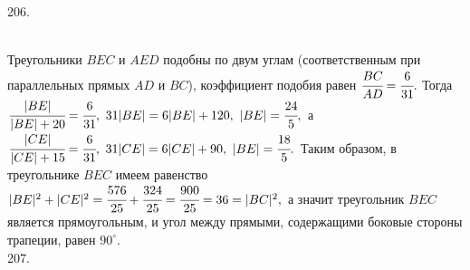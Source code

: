 \documentclass[12pt]{article}
\begin{document}
206. \begin{figure}[ht!]
\end{figure}\\
Треугольники $BEC$ и $AED$ подобны по двум углам (соответственным при параллельных прямых $AD$ и $BC$), коэффициент подобия равен $\cfrac{BC}{AD}=
\cfrac{6}{31}.$ Тогда $\cfrac{|BE|}{|BE|+20}=\cfrac{6}{31},\ 31|BE|=6|BE|+120,\ |BE|=\cfrac{24}{5},$ а $\cfrac{|CE|}{|CE|+15}=\cfrac{6}{31},\ 31|CE|=6|CE|+90,\ |BE|=\cfrac{18}{5}.$ Таким образом, в треугольнике $BEC$ имеем равенство $|BE|^2+|CE|^2=\cfrac{576}{25}+\cfrac{324}{25}=\cfrac{900}{25}=36=|BC|^2,$ а значит треугольник $BEC$ является прямоугольным, и угол между прямыми, содержащими боковые стороны трапеции, равен $90^\circ.$\\
207. \begin{figure}[ht!]
\end{figure}\\
\end{document}
